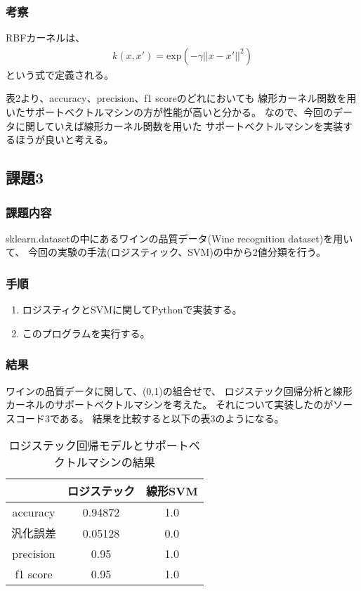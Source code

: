 \documentclass[12pt]{jarticle}
\begin{document}
\clearpage

\subsubsection*{考察}

RBFカーネルは、
\begin{eqnarray}
    k(x,x') = \text{exp}(-\gamma || x - x' ||^2) \nonumber
\end{eqnarray}
という式で定義される。

表2より、accuracy、precision、f1 scoreのどれにおいても
線形カーネル関数を用いたサポートベクトルマシンの方が性能が高いと分かる。
なので、今回のデータに関していえば線形カーネル関数を用いた
サポートベクトルマシンを実装するほうが良いと考える。

\subsection{課題3}
\subsubsection*{課題内容}
sklearn.datasetの中にあるワインの品質データ(Wine recognition dataset)を用いて、
今回の実験の手法(ロジスティック、SVM)の中から2値分類を行う。

\subsubsection*{手順}
\begin{enumerate}
    \item ロジスティクとSVMに関してPythonで実装する。
    \item このプログラムを実行する。
\end{enumerate}

\subsubsection*{結果}
ワインの品質データに関して、(0,1)の組合せで、
ロジステック回帰分析と線形カーネルのサポートベクトルマシンを考えた。
それについて実装したのがソースコード3である。
結果を比較すると以下の表3のようになる。
\begin{table}[htb]
    \caption{ロジステック回帰モデルとサポートベクトルマシンの結果}
    \begin{center}
        \begin{tabular}{|c||c|c|}
            \hline
                      & ロジステック & 線形SVM \\ \hline \hline
            accuracy  & 0.94872      & 1.0     \\ \hline
            汎化誤差  & 0.05128      & 0.0     \\ \hline
            precision & 0.95         & 1.0     \\ \hline
            f1 score  & 0.95         & 1.0     \\ \hline
        \end{tabular}
    \end{center}
\end{table}
\end{document}
